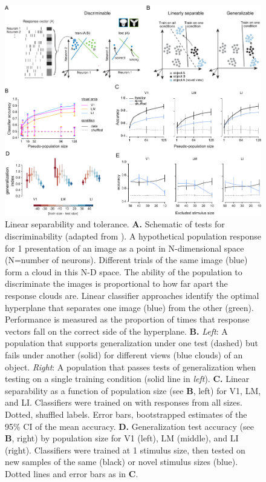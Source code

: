 \begin{figure}[t!]
    \includegraphics[width=\textwidth]{figures/chapter_4/fig_4-4_neural_generalization/fig_4-4_neural_generalization.pdf}
    \vspace{.1in}
    \caption[Population representations of objects]{Linear separability and tolerance. 
    \textbf{A.} Schematic of tests for discriminability (adapted from \cite{Rust2010SelectivityIT}). A hypothetical population response for 1 presentation of an image as a point in N-dimensional space (N=number of neurons). Different trials of the same image (blue) form a cloud in this N-D space. The ability of the population to discriminate the images is proportional to how far apart the response clouds are. Linear classifier approaches identify the optimal hyperplane that separates one image (blue) from the other (green). Performance is measured as the proportion of times that response vectors fall on the correct side of the hyperplane. 
    \textbf{B.} \textit{Left}: A population that supports generalization under one test (dashed) but fails under another (solid) for different views (blue clouds) of an object. \textit{Right}: A population that passes tests of generalization when testing on a single training condition (solid line in \textit{left}).
    \textbf{C.} Linear separability as a function of population size (see \textbf{B}, left) for V1, LM, and LI. Classifiers were trained on with responses from all sizes. Dotted, shuffled labels. Error bars, bootstrapped estimates of the 95\% CI of the mean accuracy. 
    \textbf{D.} Generalization test accuracy (see \textbf{B}, right) by population size for V1 (left), LM (middle), and LI (right). Classifiers were trained at 1 stimulus size, then tested on new samples of the same (black) or novel stimulus sizes (blue). Dotted lines and error bars as in \textbf{C}.
}
\end{figure}
